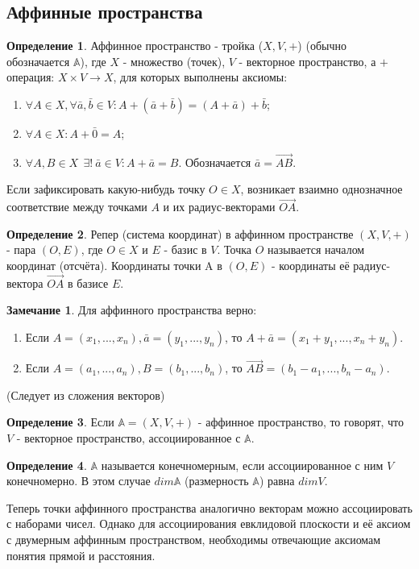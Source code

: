 \documentclass[a4paper, 12pt]{article}
\theoremstyle{definition}
\newtheorem*{definition}{Определение}
\newtheorem*{remark}{Замечание}
\begin{document}
	\subsection{Аффинные пространства}
	\begin{definition}
		Аффинное пространство - тройка ($X, V, +$) (обычно обозначается $\mathbb{A}$), где $X$ - множество (точек), $V$ - векторное пространство, а $+$ операция:  $X \times V \rightarrow X$, для которых выполнены аксиомы:
		\begin{enumerate}
			\item $\forall A \in X, \forall \bar{a}, \bar{b} \in V: A+(\bar{a}+\bar{b}) = (A+\bar{a})+\bar{b}$;
			\item $\forall A \in X: A + \bar{0} = A$;
			\item $\forall A, B \in X \ \ \exists! \ \bar{a} \in V: A + \bar{a} = B$. Обозначается $\bar{a} = \overrightarrow{AB}$.
		\end{enumerate}
	\end{definition}
	Если зафиксировать какую-нибудь точку $O \in X$, возникает взаимно однозначное соответствие между точками $A$ и их радиус-векторами $\overrightarrow{OA}$.
	\begin{definition}
		Репер (система координат) в аффинном пространстве $(X, V, +)$ - пара $(O, E)$, где $O \in X$ и $E$ - базис в $V$. Точка $O$ называется началом координат (отсчёта). Координаты точки A в $(O, E)$ - координаты её радиус-вектора $\overrightarrow{OA}$ в базисе $E$.
	\end{definition}
	\begin{remark}
		Для аффинного пространства верно:
		\begin{enumerate}
			\item Если $A = (x_{1},...,x_{n}),  \bar{a} = (y_{1},...,y_{n})$, то $A + \bar{a} = (x_{1} + y_{1},...,x_{n} + y_{n})$.
			\item Если $A = (a_{1},...,a_{n}),  B = (b_{1},...,b_{n})$, то $\overrightarrow{AB} = (b_{1} - a_{1},...,b_{n} - a_{n})$.
		\end{enumerate}
		(Следует из сложения векторов)
	\end{remark}
	\begin{definition}
		Если $\mathbb{A} = (X, V, +)$ - аффинное пространство, то говорят, что $V$ - векторное пространство, ассоциированное с $\mathbb{A}$.    
	\end{definition}
	\begin{definition}
		$\mathbb{A}$ называется конечномерным, если ассоциированное с ним $V$ конечномерно. В этом случае $dim \mathbb{A}$ (размерность $\mathbb{A}$) равна $dim V$.
	\end{definition}
	Теперь точки аффинного пространства аналогично векторам можно ассоциировать с наборами чисел. Однако для ассоциирования евклидовой плоскости и её аксиом с двумерным аффинным пространством, необходимы отвечающие аксиомам понятия прямой и расстояния.
\end{document}
